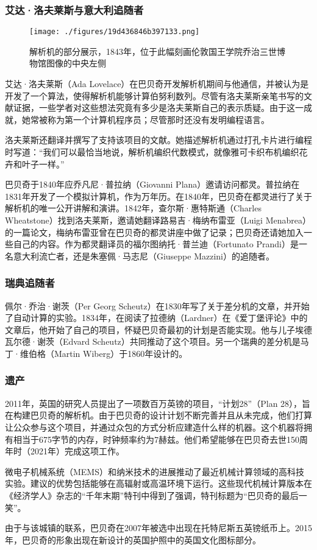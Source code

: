 \subsubsection{艾达·洛夫莱斯与意大利追随者}
\begin{figure}[ht]
\centering
\texttt{[image: ./figures/19d436846b397133.png]}
\caption{解析机的部分展示，1843年，位于此幅刻画伦敦国王学院乔治三世博物馆图像的中央左侧} \label{fig_CRSBQ_14}
\end{figure}
艾达·洛夫莱斯（Ada Lovelace）在巴贝奇开发解析机期间与他通信，并被认为是开发了一个算法，使得解析机能够计算伯努利数列。尽管有洛夫莱斯亲笔书写的文献证据，一些学者对这些想法究竟有多少是洛夫莱斯自己的表示质疑。由于这一成就，她常被称为第一个计算机程序员；尽管那时还没有发明编程语言。

洛夫莱斯还翻译并撰写了支持该项目的文献。她描述解析机通过打孔卡片进行编程时写道：“我们可以最恰当地说，解析机编织代数模式，就像雅可卡织布机编织花卉和叶子一样。”

巴贝奇于1840年应乔凡尼·普拉纳（Giovanni Plana）邀请访问都灵。普拉纳在1831年开发了一个模拟计算机，作为万年历。在1840年，巴贝奇在都灵进行了关于解析机的唯一公开讲解和演讲。1842年，查尔斯·惠特斯通（Charles Wheatstone）找到洛夫莱斯，邀请她翻译路易吉·梅纳布雷亚（Luigi Menabrea）的一篇论文，梅纳布雷亚曾在巴贝奇的都灵讲座中做了记录；巴贝奇还请她加入一些自己的内容。作为都灵翻译员的福尔图纳托·普兰迪（Fortunato Prandi）是一名意大利流亡者，还是朱塞佩·马志尼（Giuseppe Mazzini）的追随者。
\subsubsection{瑞典追随者} 
佩尔·乔治·谢茨（Per Georg Scheutz）在1830年写了关于差分机的文章，并开始了自动计算的实验。1834年，在阅读了拉德纳（Lardner）在《爱丁堡评论》中的文章后，他开始了自己的项目，怀疑巴贝奇最初的计划是否能实现。他与儿子埃德瓦尔德·谢茨（Edvard Scheutz）共同推动了这个项目。另一个瑞典的差分机是马丁·维伯格（Martin Wiberg）于1860年设计的。
\subsubsection{遗产} 
2011年，英国的研究人员提出了一项数百万英镑的项目，“计划28”（Plan 28），旨在构建巴贝奇的解析机。由于巴贝奇的设计计划不断完善并且从未完成，他们打算让公众参与这个项目，并通过众包的方式分析应建造什么样的机器。这个机器将拥有相当于675字节的内存，时钟频率约为7赫兹。他们希望能够在巴贝奇去世150周年时（2021年）完成这项工作。

微电子机械系统（MEMS）和纳米技术的进展推动了最近机械计算领域的高科技实验。建议的优势包括能够在高辐射或高温环境下运行。这些现代机械计算版本在《经济学人》杂志的“千年末期”特刊中得到了强调，特刊标题为“巴贝奇的最后一笑”。

由于与该城镇的联系，巴贝奇在2007年被选中出现在托特尼斯五英镑纸币上。2015年，巴贝奇的形象出现在新设计的英国护照中的英国文化图标部分。